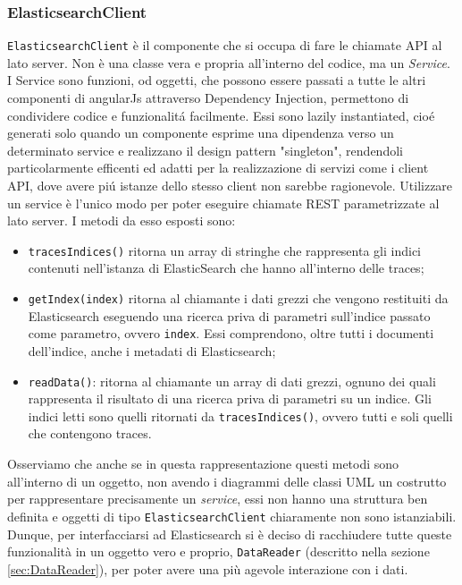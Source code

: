\subsubsection{ElasticsearchClient} 
\texttt{ElasticsearchClient} è il componente che si occupa di fare le chiamate API al lato server. Non è una classe vera e propria all'interno del codice, ma un \emph{Service}. 
I Service sono funzioni, od oggetti, che possono essere passati a tutte le altri componenti di angularJs attraverso Dependency Injection, permettono di condividere codice e funzionalitá facilmente. Essi sono lazily instantiated, cioé generati solo quando un componente esprime una dipendenza verso un determinato service e realizzano il design pattern "singleton", rendendoli particolarmente efficenti ed adatti per la realizzazione di servizi come i client API, dove avere piú istanze dello stesso client non sarebbe ragionevole.
Utilizzare un service è l'unico modo per poter eseguire chiamate REST parametrizzate al lato server. I metodi da esso esposti sono: 
\begin{itemize} 
  \item \texttt{tracesIndices()} ritorna un array di stringhe che rappresenta gli indici contenuti nell'istanza di ElasticSearch che hanno all'interno delle traces; 
  \item \texttt{getIndex(index)} ritorna al chiamante i dati grezzi che vengono restituiti da Elasticsearch eseguendo una ricerca priva di parametri sull'indice passato come parametro, ovvero \texttt{index}. Essi comprendono, oltre tutti i documenti dell'indice, anche i metadati di Elasticsearch; 
  \item \texttt{readData()}: ritorna al chiamante un array di dati grezzi, ognuno dei quali rappresenta il risultato di una ricerca priva di parametri su un indice. Gli indici letti sono quelli ritornati da \texttt{tracesIndices()}, ovvero tutti e soli quelli che contengono traces. 
\end{itemize} 
Osserviamo che anche se in questa rappresentazione questi metodi sono all'interno di un oggetto, non avendo i diagrammi delle classi UML un costrutto per rappresentare precisamente un \emph{service}, essi non hanno una struttura ben definita e oggetti di tipo \texttt{ElasticsearchClient} chiaramente non sono istanziabili. Dunque, per interfacciarsi ad Elasticsearch si è deciso di racchiudere tutte queste funzionalità in un oggetto vero e proprio, \texttt{DataReader} (descritto nella sezione \ref{sec:DataReader}), per poter avere una più agevole interazione con i dati. 
 

